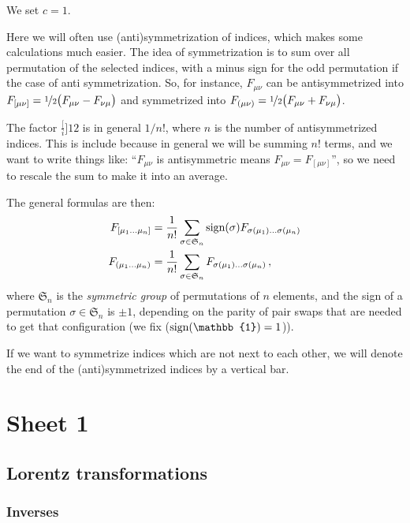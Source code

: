 \documentclass[main.tex]{subfiles}
\begin{document}
We set $c=1$.

Here we will often use (anti)symmetrization of indices, which makes some calculations much easier. The idea of symmetrization is to sum over all permutation of the selected indices, with a minus sign for the odd permutation if the case of anti symmetrization. So, for instance, \(F_{\mu \nu }\) can be antisymmetrized into \(F_{[\mu \nu ]} = \frac[i]{1}{2} \qty(F_{\mu \nu }- F_{\nu \mu })\) and symmetrized into \(F_{(\mu \nu )}= \frac[i]{1}{2} \qty(F_{\mu \nu } + F_{\nu \mu })\).

The factor \(\frac[i]{1}{2} \) is in general \(1/n!\), where \(n\) is the number of antisymmetrized indices. This is include because in general we will be summing \(n!\) terms, and we want to write things like: ``\(F_{\mu \nu }\) is antisymmetric means \(F_{\mu \nu} = F_{[\mu \nu ]}\)'', so we need to rescale the sum to make it into an average.

The general formulas are then: 
%
\begin{subequations}
\begin{align}
  F_{[\mu_{1} \dots \mu_{n}]} &= \frac{1}{n!} \sum _{\sigma  \in \mathfrak{S}_n} \sign{\sigma} F_{\sigma (\mu_1)\dots \sigma(\mu_n)} \\
  F_{(\mu_{1} \dots \mu_{n})} &= \frac{1}{n!} \sum _{\sigma  \in \mathfrak{S}_n}F_{\sigma (\mu_1)\dots \sigma(\mu_n)}
\,,  
\end{align}
\end{subequations}
%
where \(\mathfrak{S}_n\) is the \emph{symmetric group} of permutations of \(n\) elements, and the sign of a permutation \(\sigma \in \mathfrak S_n\) is \(\pm 1\), depending on the parity of pair swaps that are needed to get that configuration (we fix (\(\sign{\mathbb{1}} = 1\))). 

If we want to symmetrize indices which are not next to each other, we will denote the end of the (anti)symmetrized indices by a vertical bar.

\section{Sheet 1}

\subsection{Lorentz transformations }

\subsubsection{Inverses}
\end{document}
